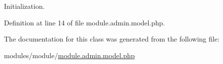 Initialization. 



Definition at line 14 of file module.\+admin.\+model.\+php.



The documentation for this class was generated from the following file\+:\begin{DoxyCompactItemize}
\item 
modules/module/\hyperlink{module_8admin_8model_8php}{module.\+admin.\+model.\+php}\end{DoxyCompactItemize}
